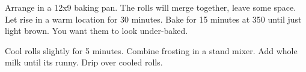 \begin{recipe}
Arrange in a 12x9 baking pan. The rolls will merge together, leave some space. 
Let rise in a warm location for 30 minutes. 
Bake for 15 minutes at 350\degree{} until just light brown. 
You want them to look under-baked.


Cool rolls slightly for 5 minutes. Combine frosting in a stand mixer. Add whole milk until its runny. Drip over cooled rolls. 

\end{recipe}
